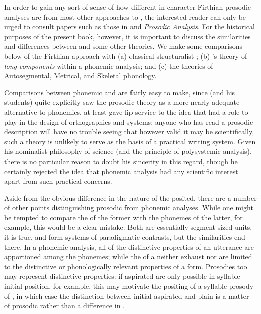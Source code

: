 In order to gain any sort of sense of how different in character Firthian prosodic
analyses are from most other approaches to , the
interested reader can only be urged to consult papers such as those in
\citet{studies.in.linguistic.analysis} and
 \textsl{Prosodic Analysis}. For the
historical purposes of the present book, however, it is important to
discuss the similarities and differences between  and
some other theories. We make some comparisons below of the Firthian
approach with (a) classical structuralist ; (b)
{\Harris}'s theory of \emph{long components} within a phonemic analysis;
and (c) the theories of Autosegmental, Metrical, and Skeletal
phonology.

Comparisons between phonemic and  are fairly easy to
make, since {\Firth} (and his students) quite explicitly saw the prosodic
theory as a more nearly adequate alternative to phonemics. {\Firth} at
least gave lip service to the idea that  had a role to
play in the design of orthographies and  systems: anyone
who has read a prosodic description will have no trouble seeing that
however valid it may be scientifically, such a theory is unlikely to
serve as the basis of a practical writing system. Given his nominalist
philosophy of science (and the principle of polysystemic analysis),
there is no particular reason to doubt his sincerity in this regard,
though he certainly rejected the idea that phonemic analysis had any
scientific interest apart from such practical concerns.

Aside from the obvious difference in the nature of the 
posited, there are a number of other points distinguishing prosodic
from phonemic analyses. While one might be tempted to compare the
 of the former with the phonemes of the latter, for
example, this would be a clear mistake. Both are essentially
segment-sized units, it is true, and form systems of paradigmatic
contrasts, but the similarities end there. In a phonemic analysis, all
of the distinctive properties of an utterance are apportioned among
the phonemes; while the  of a 
neither exhaust nor are limited to the distinctive or phonologically
relevant properties of a form. Prosodies too may represent distinctive
properties: if aspirated  are only possible in syllable-initial
position, for example, this may motivate the positing of a
syllable-prosody of , in which case the distinction between
initial aspirated and plain  is a matter of prosodic 
rather than a difference in .

